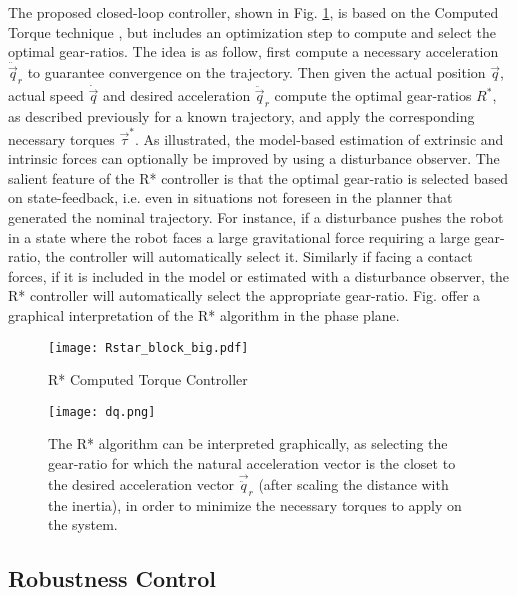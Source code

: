 The proposed closed-loop controller, shown in Fig. \ref{fig:Rstar_block_big}, is based on the Computed Torque technique \cite{asada_robot_1986}, but includes an optimization step to compute and select the optimal gear-ratios. The idea is as follow, first compute a necessary acceleration $\ddot{\vec{q}}_r$ to guarantee convergence on the trajectory. Then given the actual position $\vec{q}$, actual speed $\dot{\vec{q}}$ and desired acceleration $\ddot{\vec{q}}_r$ compute the optimal gear-ratios $R^*$, as described previously for a known trajectory, and apply the corresponding necessary torques $\vec{\tau}^*$. As illustrated, the model-based estimation of extrinsic and intrinsic forces can optionally be improved by using a disturbance observer. The salient feature of the R* controller is that the optimal gear-ratio is selected based on state-feedback, i.e. even in situations not foreseen in the planner that generated the nominal trajectory. For instance, if a disturbance pushes the robot in a state where the robot faces a large gravitational force requiring a large gear-ratio, the controller will automatically select it. Similarly if facing a contact forces, if it is included in the model or estimated with a disturbance observer, the R* controller will automatically select the appropriate gear-ratio. Fig. \pageref{fig:dq} offer a graphical interpretation of the R* algorithm in the phase plane. 

\begin{figure}[t]
	\centering
		\texttt{[image: Rstar\_block\_big.pdf]}
	\caption{R* Computed Torque Controller}
	\label{fig:Rstar_block_big}
\end{figure}

\begin{figure}[htp]
	\centering
		\texttt{[image: dq.png]}
	\caption[R* algorithm graphical interpretation]{The R* algorithm can be interpreted graphically, as selecting the gear-ratio for which the natural acceleration vector is the closet to the desired acceleration vector $\vec{\ddot{q}}_r$ (after scaling the distance with the inertia), in order to minimize the necessary torques to apply on the system.}
	\label{fig:dq}
\end{figure}

\subsection{Robustness Control}
\label{sec:robustcontrol}


